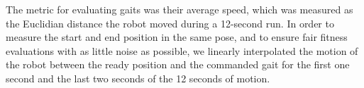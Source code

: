 
The metric for evaluating gaits was their
average speed, which was measured as the Euclidian distance the robot
moved during a 12-second run. 
%
%
In order to measure the start and end position in the same pose, and
to ensure fair fitness evaluations with as little noise as possible,
we linearly interpolated the motion of the robot between the ready
position and the commanded gait for the first one second and the last
two seconds of the 12 seconds of motion.



